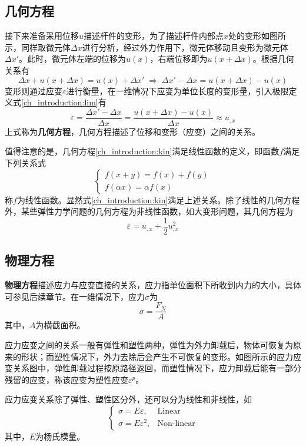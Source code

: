 \subsection{几何方程}
接下来准备采用位移$u$描述杆件的变形，为了描述杆件内部点$x$处的变形如图所示，同样取微元体$\Delta x$进行分析，经过外力作用下，微元体移动且变形为微元体$\Delta x'$。此时，微元体左端的位移为$u(x)$，右端位移即为$u(x+\Delta x)$。根据几何关系有
\begin{equation}
    \Delta x + u(x+\Delta x) = u(x) + \Delta x' \; \Rightarrow \; \Delta x' - \Delta x = u(x+\Delta x) - u(x)
\end{equation}
变形则通过应变$\varepsilon$进行衡量，在一维情况下应变为单位长度的变形量，引入极限定义式\eqref{ch_introduction:lim}有
\begin{equation}\label{ch_introduction:kin}
    \varepsilon = \frac{\Delta x' - \Delta x}{\Delta x} = \frac{u(x+\Delta x) - u(x)}{\Delta x} \approx u_{,x}
\end{equation}
上式称为\textbf{几何方程}，几何方程描述了位移和变形（应变）之间的关系。\par
值得注意的是，几何方程\eqref{ch_introduction:kin}满足线性函数的定义，即函数$f$满足下列关系式
\begin{equation}
\begin{cases}
f(x+y) = f(x) + f(y) \\ f(\alpha x) = \alpha f(x)
\end{cases}
\end{equation}
称$f$为线性函数。显然式\eqref{ch_introduction:kin}满足上述关系。除了线性的几何方程外，某些弹性力学问题的几何方程为非线性函数，如大变形问题，其几何方程为
\begin{equation}
    \varepsilon = u_{,x} + \frac{1}{2} u_{,x}^{2}
\end{equation} \par

\subsection{物理方程}
\textbf{物理方程}描述应力与应变直接的关系，应力指单位面积下所收到内力的大小，具体可参见后续章节。在一维情况下，应力$\sigma$为
\begin{equation}
    \sigma = \frac{F_N}{A}
\end{equation}
其中，$A$为横截面积。\par
应力应变之间的关系一般有弹性和塑性两种，弹性为外力卸载后，物体可恢复为原来的形状；而塑性情况下，外力去除后会产生不可恢复的变形。如图所示的应力应变关系图中，弹性卸载过程按原路径返回，而塑性情况下，应力卸载后能有一部分残留的应变，称该应变为塑性应变$\varepsilon^p$。\par
应力应变关系除了弹性、塑性区分外，还可以分为线性和非线性，如
\begin{equation}
\begin{cases}
    \sigma = E \varepsilon, & \text{Linear} \\
    \sigma = E \varepsilon^2, & \text{Non-linear}
\end{cases}
\end{equation}
其中，$E$为杨氏模量。\par

